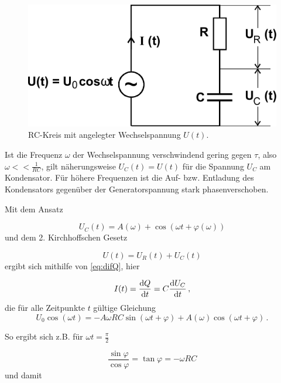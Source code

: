 \begin{figure}[H]
    \centering
    \includegraphics{figures/RC-Kreis Wechselspannung.pdf}
    \caption{RC-Kreis mit angelegter Wechselspannung $U(t)$\cite{ap08}.}
    \label{fig:sinspann}
\end{figure}

Ist die Frequenz $ω$ der Wechselspannung verschwindend gering gegen $τ$, also $ω << \frac{1}{RC}$, gilt näherungsweise $U_C(t) = U(t)$ für die Spannung $U_C$ am Kondensator.
Für höhere Frequenzen ist die Auf- bzw. Entladung des Kondensators gegenüber der Generatorspannung stark phasenverschoben.

Mit dem Ansatz

\begin{equation*}
    U_C(t) = A(ω) + \cos(ω t + \varphi(ω))
\end{equation*} und dem 2. Kirchhoffschen Gesetz

\begin{equation*}
    U(t) = U_R(t) + U_C(t)
\end{equation*} ergibt sich mithilfe von \eqref{eq:difQ}, hier

\begin{equation}
    I(t) = \frac{\mathrm{d} Q}{\mathrm{d} t} = C \frac{\mathrm{d} U_C}{\mathrm{d} t} \,,
    \label{eq:It}
\end{equation}
die für alle Zeitpunkte $t$ gültige Gleichung
\begin{equation}
    U_0 \cos(\omega t) = - A \omega R C  \sin(\omega t + \varphi) + A(\omega) \cos(\omega t + \varphi) \,.
    \label{eq:U_0omegagedöns}
\end{equation}

So ergibt sich z.B. für $\omega t = \frac{\pi}{2}$

\begin{equation*}
    \frac{\sin\varphi}{\cos\varphi} = \tan\varphi = -ω R C
\end{equation*} und damit 

